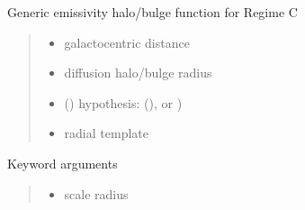 \documentclass[letterpaper,10pt,english]{sphinxmanual}
\begin{document}

\begin{fulllineitems}
\label{\detokenize{diffsph.profiles:diffsph.profiles.hfactors.Hem_C}}
\pysigstartsignatures
{}
\pysigstopsignatures
\sphinxAtStartPar
Generic emissivity halo/bulge function for Regime C
\begin{quote}\begin{description}
\begin{itemize}
\item {} 
\sphinxAtStartPar
{} \textendash{} galactocentric distance

\item {} 
\sphinxAtStartPar
{} \textendash{} diffusion halo/bulge radius

\item {} 
\sphinxAtStartPar
{} () \textendash{} hypothesis:  (),  or )

\item {} 
\sphinxAtStartPar
{} \textendash{} radial template

\end{itemize}

\end{description}\end{quote}

\sphinxAtStartPar
Keyword arguments
\begin{quote}\begin{description}
\begin{itemize}
\item {} 
\sphinxAtStartPar
{} \textendash{} scale radius


\end{itemize}
\end{description}
\end{quote}
\end{fulllineitems}
\end{document}
